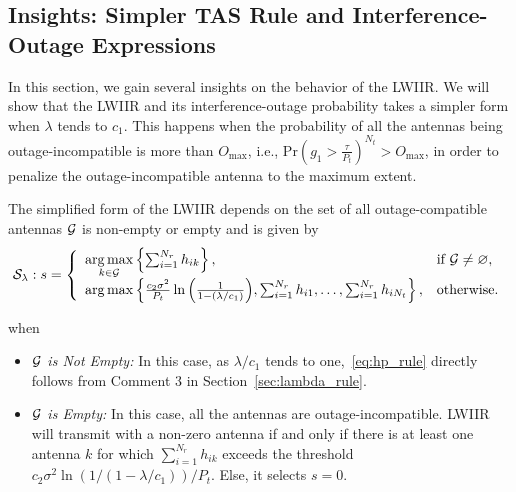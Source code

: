 \documentclass[12pt,draftcls,peerreview,onecolumn]{IEEEtran}
\newcommand{\brac}[1]{\left({#1}\right)}
\newcommand{\ie}{{i.e.}}
\newcommand{\prob}[1]{\text{Pr}\brac{#1}}
\DeclareMathOperator*{\argmin}{arg\,min}
\DeclareMathOperator*{\argmax}{arg\,max}
\newcommand{\lam}{\lambda}
\newcommand{\goodset}{\cal{G}}
\newcommand{\Nt}{{N_t}}
\newcommand{\Nr}{{N_r}}
\newcommand{\Pt}{{P_t}}
\newcommand{\such}{h}
\newcommand{\puch}{g}
\newcommand{\hk}[1]{{\such_{#1}}}
\newcommand{\gk}[1]{{\puch_{#1}}}
\newcommand{\noisevar}{\sigma^2}
\newcommand{\outmax}{O_{\text{max}}}
\newcommand{\itau}{\tau}
\newcommand{\cone}{c_{1}}
\newcommand{\ctwo}{c_{2}}
\newcommand{\m}{\cone}
\newcommand{\taubypt}{\frac{\itau}{\Pt}}
\newcommand{\gkgrtaubypt}[1]{{\gk{#1}}>\taubypt}
\newcommand{\lambym}{\frac{\lam}{\m}}
\newcommand{\yk}[1]{y_{#1}}
\newcommand{\ykplambym}[1]{\yk{#1}+\lambym}
\newcommand{\al}{\ctwo}
\newcommand{\igamma}{{\frac{\al\noisevar}{\Pt}\ln\left(\frac{1}{1-\left(\lam/\m\right) }\right)}}
\newcommand{\igammainline}{{ {\al\noisevar} \ln\left({1}/\left( {1-\lam/\m }\right) \right)}/{\Pt}}
\newcommand{\callamrule}{{\cal S_{{\lam}}}}
\newcommand{\nullset}{\varnothing}
\newcommand{\sumnr}{\sum_{i=1}^{\Nr}}
\begin{document}
%
%

\subsection{Insights: Simpler TAS Rule and Interference-Outage Expressions}
In this section, we gain several insights on the behavior of the LWIIR. We will show that the LWIIR and its interference-outage probability takes a simpler form when $\lam$ tends to $\cone$. This happens when the probability of all the antennas being outage-incompatible is more than $\outmax$, \ie, $\prob{\gkgrtaubypt{1}}^{\Nt}>\outmax$, in order to penalize the outage-incompatible antenna to the maximum extent.  
%

The simplified form of the LWIIR depends on the set of all outage-compatible antennas $\goodset$ is non-empty  or empty and is given by
\begin{equation}
\label{eq:hp_rule}
\callamrule: s = \left\{
\begin{array}{ll}
\argmax\limits_{k\in\goodset}\left\lbrace \sumnr \hk{ik}\right\rbrace , & \text{if}~\goodset\neq\nullset, \\
\argmax\left\lbrace \igamma,\sumnr\hk{i1},\dots,\sumnr\hk{i\Nt}\right\rbrace , &\text{otherwise}.
\end{array}\right.
\end{equation}

when
\begin{itemize}
\item {\em $\goodset$ is Not Empty:} In this case, as $\lam/\m$ tends to one,~\eqref{eq:hp_rule} directly follows from Comment 3 in Section~\ref{sec:lambda_rule}.
	
\item {\em $\goodset$ is Empty:} In this case, all the antennas are outage-incompatible. LWIIR will transmit with a non-zero antenna if and only if there is at least one antenna $k$ for which $\sumnr \hk{ik}$ exceeds the threshold  $\igammainline$. Else, it selects $s=0$.
\end{itemize}
\end{document}
